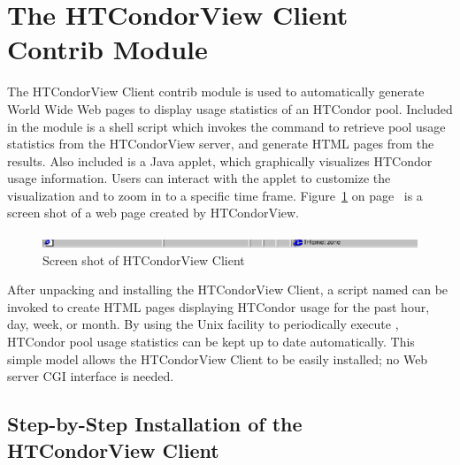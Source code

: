 \section{The HTCondorView Client Contrib Module}\label{sec:HTCondorView-Client-Install}

The HTCondorView Client contrib module is used to automatically generate
World Wide Web pages to display usage statistics of an HTCondor
pool.
Included in the module is a shell script which invokes the 
command to retrieve pool usage statistics from the HTCondorView server, and
generate HTML pages from the results.  
Also included is a Java applet, which graphically visualizes HTCondor 
usage information.  
Users can interact with the applet to customize the visualization and to
zoom in to a specific time frame.
Figure~\ref{fig:view-screenshot} on page~\pageref{fig:view-screenshot}
is a screen shot of a web page created by HTCondorView.  

\begin{figure}[hbt]
\centering
\includegraphics{contrib/view-screenshot}
\caption{\label{fig:view-screenshot}Screen shot of HTCondorView Client}
\end{figure}

After unpacking and installing the HTCondorView Client, a script named
 can be invoked to create HTML pages displaying HTCondor usage
for the past hour, day, week, or month.  
By using the Unix  facility to periodically execute
, HTCondor pool usage statistics can be kept up to date
automatically.  
This simple model allows the HTCondorView Client to be easily installed;
no Web server CGI interface is needed.

\subsection{\label{sec:condorview-client-step-by-step}
Step-by-Step Installation of the HTCondorView Client}

